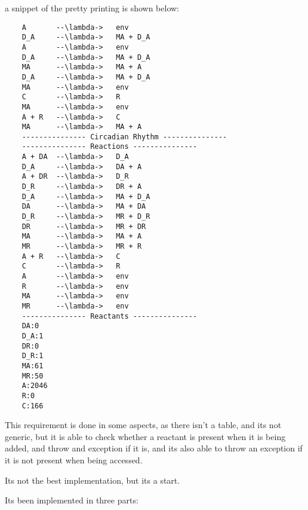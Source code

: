 a snippet of the pretty printing is shown below:

\begin{lstlisting}
    A       --\lambda->   env
    D_A     --\lambda->   MA + D_A
    A       --\lambda->   env
    D_A     --\lambda->   MA + D_A
    MA      --\lambda->   MA + A
    D_A     --\lambda->   MA + D_A
    MA      --\lambda->   env
    C       --\lambda->   R
    MA      --\lambda->   env
    A + R   --\lambda->   C
    MA      --\lambda->   MA + A
    --------------- Circadian Rhythm ---------------
    --------------- Reactions ---------------
    A + DA  --\lambda->   D_A
    D_A     --\lambda->   DA + A
    A + DR  --\lambda->   D_R
    D_R     --\lambda->   DR + A
    D_A     --\lambda->   MA + D_A
    DA      --\lambda->   MA + DA
    D_R     --\lambda->   MR + D_R
    DR      --\lambda->   MR + DR
    MA      --\lambda->   MA + A
    MR      --\lambda->   MR + R
    A + R   --\lambda->   C
    C       --\lambda->   R
    A       --\lambda->   env
    R       --\lambda->   env
    MA      --\lambda->   env
    MR      --\lambda->   env
    --------------- Reactants ---------------
    DA:0
    D_A:1
    DR:0
    D_R:1
    MA:61
    MR:50
    A:2046
    R:0
    C:166
\end{lstlisting}


This requirement is done in some aspects, as there isn't a table, and its not generic, but it is able to check whether a reactant is present when it is being added, and throw and exception if it is, and its also able to throw an exception if it is not present when being accessed.

Its not the best implementation, but its a start.


Its been implemented in three parts:


